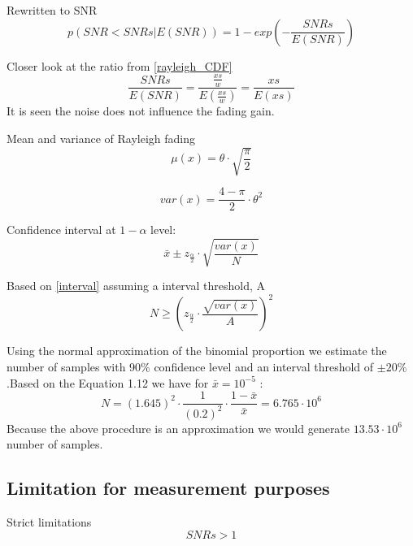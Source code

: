Rewritten to SNR
\begin{equation}\label{rayleigh_CDF}
p(SNR < SNRs | E\left(SNR\right)) = 1-exp\left(-\frac{SNRs}{E\left(SNR\right)}\right)
\end{equation}

Closer look at the ratio from \autoref{rayleigh_CDF}
\begin{equation}
\frac{SNRs}{E\left(SNR\right)} = \frac{\frac{xs}{w}}{E\left(\frac{xs}{w}\right)} = \frac{xs}{E\left(xs\right)} 
\end{equation}
It is seen the noise does not influence the fading gain. %

Mean and variance of Rayleigh fading
\begin{equation}
\mu(x) = \theta\cdot\sqrt{\frac{\pi}{2}}
\end{equation}

\begin{equation}\label{rayleigh_var}
var(x) = \frac{4-\pi}{2}\cdot \theta^2
\end{equation}


Confidence interval at $1-\alpha$ level:
\begin{equation}\label{interval}
\bar{x} \pm z_{\frac{\alpha}{2}} \cdot \sqrt{\frac{var(x)}{N}}
\end{equation}

Based on \autoref{interval} assuming a interval threshold, A
\begin{equation}\label{interval2}
N \geq \left(z_{\frac{\alpha}{2}} \cdot \frac{\sqrt{var(x)}}{A} \right)^2
\end{equation}

Using the normal approximation of the binomial proportion we  estimate the number of samples with 90\% confidence level and an interval threshold of $\pm 20\%$ .Based on the Equation 1.12 we have for $ \bar{x} = 10^{-5} $ :
\begin{equation}\label{sampleEQ}
N=(1.645)^{2} \cdot \frac{1}{(0.2)^{2}} \cdot \frac{1-\bar{x}}{\bar{x}} = 6.765 \cdot 10^{6}
\end{equation}
Because the above procedure is an approximation we would generate $ 13.53 \cdot 10^{6} $ number of samples.
\subsection{Limitation for measurement purposes}

Strict limitations
\begin{equation}
SNRs > 1
\end{equation}


